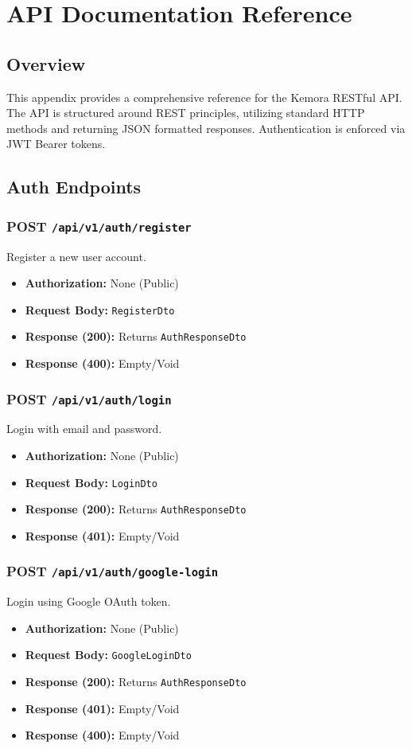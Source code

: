 \appendix
\chapter{API Documentation Reference}

\section{Overview}
This appendix provides a comprehensive reference for the Kemora RESTful API. The API is structured around REST principles, utilizing standard HTTP methods and returning JSON formatted responses. Authentication is enforced via JWT Bearer tokens.

\section{Auth Endpoints}

\subsection{POST \texttt{/api/v1/auth/register}}
Register a new user account.
\begin{itemize}
    \item \textbf{Authorization:} None (Public)
    \item \textbf{Request Body:} \texttt{RegisterDto}
    \item \textbf{Response (200):} Returns \texttt{AuthResponseDto}
    \item \textbf{Response (400):} Empty/Void
\end{itemize}

\subsection{POST \texttt{/api/v1/auth/login}}
Login with email and password.
\begin{itemize}
    \item \textbf{Authorization:} None (Public)
    \item \textbf{Request Body:} \texttt{LoginDto}
    \item \textbf{Response (200):} Returns \texttt{AuthResponseDto}
    \item \textbf{Response (401):} Empty/Void
\end{itemize}

\subsection{POST \texttt{/api/v1/auth/google-login}}
Login using Google OAuth token.
\begin{itemize}
    \item \textbf{Authorization:} None (Public)
    \item \textbf{Request Body:} \texttt{GoogleLoginDto}
    \item \textbf{Response (200):} Returns \texttt{AuthResponseDto}
    \item \textbf{Response (401):} Empty/Void
    \item \textbf{Response (400):} Empty/Void
\end{itemize}

